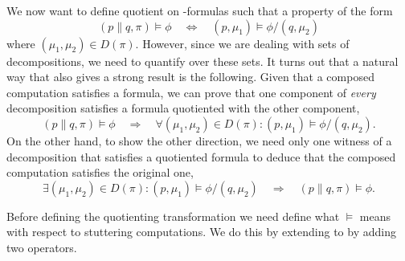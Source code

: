 We now want to define quotient on \HMLpast-formulas such that a property of the
form
\[
    (p\parallel q, \pi) \vDash \phi  \quad\Leftrightarrow\quad
    (p, \mu_1) \vDash \phi/(q, \mu_2)
\]
where $(\mu_1,\mu_2) \in D(\pi)$. However, since we are dealing with sets of
decompositions, we need to quantify over these sets. It turns out that a
natural way that also gives a strong result is the following. Given that a composed
computation satisfies a formula, we can prove that one component of {\em every}
decomposition satisfies a formula quotiented with the other component,
\[
    (p\parallel q, \pi) \vDash \phi  \quad\Rightarrow\quad
    \forall (\mu_1,\mu_2) \in D(\pi) : (p, \mu_1) \vDash \phi/(q, \mu_2).
\]
On the other hand, to show the other direction, we need only one witness of a
decomposition that satisfies a quotiented formula to deduce that the composed
computation satisfies the original one,
\[
    \exists (\mu_1,\mu_2) \in D(\pi) : (p, \mu_1) \vDash \phi/(q, \mu_2)
    \quad\Rightarrow\quad
    (p\parallel q, \pi) \vDash \phi.
\]

Before defining the quotienting transformation we need define what $\vDash$ 
means with respect to stuttering computations.
We do this by extending \HMLpast{} to \HMLpp{} by adding
two operators.

